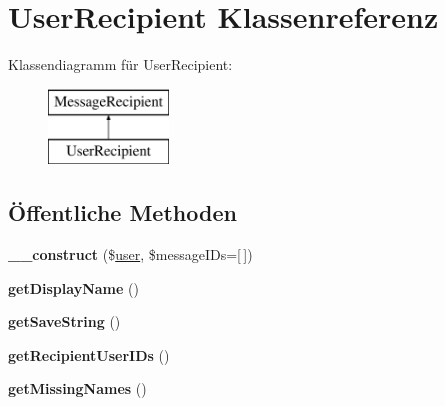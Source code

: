 \hypertarget{class_user_recipient}{}\section{User\+Recipient Klassenreferenz}
\label{class_user_recipient}
Klassendiagramm für User\+Recipient\+:\begin{figure}[H]
\begin{center}
\leavevmode
\includegraphics[height=2.000000cm]{class_user_recipient}
\end{center}
\end{figure}
\subsection*{Öffentliche Methoden}
\begin{DoxyCompactItemize}
\item 
\mbox{\label{class_user_recipient_acdcba8d335d160572916ffb43178588c}} 
{\bfseries \+\_\+\+\_\+construct} (\$\mbox{\hyperlink{classuser}{user}}, \$message\+I\+Ds=\mbox{[}$\,$\mbox{]})
\item 
\mbox{\label{class_user_recipient_afedf5f61002ee599d254dfc542fbfcc2}} 
{\bfseries get\+Display\+Name} ()
\item 
\mbox{\label{class_user_recipient_a345ac53a007a5c919fac31782c8452f1}} 
{\bfseries get\+Save\+String} ()
\item 
\mbox{\label{class_user_recipient_aa6c15464fcf7898513b4ae550469990d}} 
{\bfseries get\+Recipient\+User\+I\+Ds} ()
\item 
\mbox{\label{class_user_recipient_a6b0881a2a8b5a0eecd05390b5a2275bb}} 
{\bfseries get\+Missing\+Names} ()
\end{DoxyCompactItemize}

